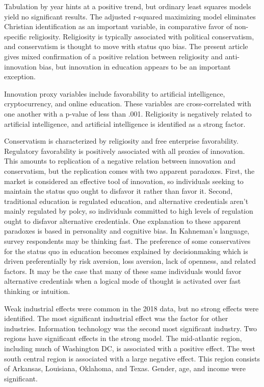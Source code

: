 \documentclass[AER]{./aea-latex-templates/AEA}
\begin{document}
Tabulation by year hints at a positive trend,
but ordinary least squares models yield no significant results.
The adjusted r-squared maximizing model eliminates Christian identification as an important variable,
in comparative favor of non-specific religiosity.
Religiosity is typically associated with political conservatism, and conservatism is
thought to move with status quo bias\cite{eidelman2012bias}. The present article gives mixed
confirmation of a positive relation between religiosity and
anti-innovation bias, but innovation in education appears to be an important exception.

Innovation proxy variables include favorability to artificial
intelligence, cryptocurrency, and online education. These variables are
cross-correlated with one another with a p-value of less than .001.
Religiosity is negatively related to artificial intelligence, and
artificial intelligence is identified as a strong factor.

Conservatism is characterized by religiosity and free enterprise favorability.
Regulatory favorability is positively associated with all proxies of innovation.
This amounts to replication of a negative relation between innovation and conservatism,
but the replication comes with two apparent paradoxes.
First, the market is considered an effective tool of innovation\cite{baumol2002free},
so individuals seeking to maintain the status quo ought to disfavor it rather than favor it.
Second, traditional education is regulated education,
and alternative credentials aren't mainly regulated by polcy,
so individuals committed to high levels of regulation ought to disfavor
alternative credentials.
One explanation to these apparent paradoxes is based in personality and cognitive bias.
In Kahneman's language\cite{kahneman2011thinking}, survey respondents may be thinking fast.
The preference of some conservatives for the status quo in education becomes explained by
decisionmaking which is driven preferentially by
risk aversion, loss aversion, lack of openness, and related factors.
It may be the case that many of these same individuals would favor alternative
credentials when a logical mode of thought is activated over fast thinking or intuition.

Weak industrial effects were common in the 2018 data, but no strong effects were identified.
The most significant industrial effect was the factor for other industries. Information technology was the second most significant industry.
Two regions have significant effects in the strong model.
The mid-atlantic region, including much of Washington DC, is associated with a positive effect.
The west south central region is associated with a large negative effect.
This region consists of Arkansas, Louisiana, Oklahoma, and Texas\cite{uscensusbureau_2016}.
Gender, age, and income were significant.
\end{document}
